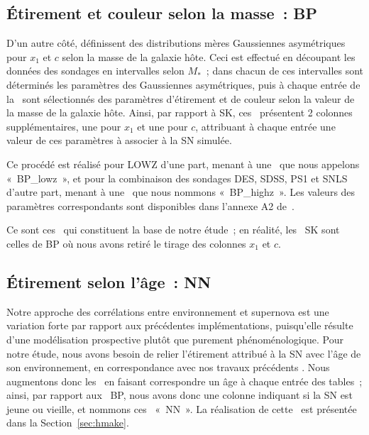 \documentclass[../main/main.tex]{subfiles}
\begin{document}
\subsection{Étirement et couleur selon la masse~: BP}\label{ssec:bp}

D'un autre côté,  définissent des distributions mères
Gaussiennes asymétriques pour $x_1$ et $c$ selon la masse de la galaxie hôte.
Ceci est effectué en découpant les données des sondages en intervalles selon
$M_*$~; dans chacun de ces intervalles sont déterminés les paramètres des
Gaussiennes asymétriques, puis à chaque entrée de la \hostlib\ sont sélectionnés
des paramètres d'étirement et de couleur selon la valeur de la masse de la
galaxie hôte. Ainsi, par rapport à SK, ces \hostlib\ présentent 2 colonnes
supplémentaires, une pour $x_1$ et une pour $c$, attribuant à chaque entrée une
valeur de ces paramètres à associer à la SN simulée. 

Ce procédé est réalisé pour LOWZ d'une part, menant à une \hostlib\ que nous
appelons «~BP\_lowz~», et pour la combinaison des sondages DES, SDSS, PS1 et
SNLS d'autre part, menant à une \hostlib\ que nous nommons «~BP\_highz~». Les
valeurs des paramètres correspondants sont disponibles dans l'annexe A2
de~.

Ce sont ces \hostlib\ qui constituent la base de notre étude~; en réalité, les
\hostlib\ SK sont celles de BP où nous avons retiré le tirage des colonnes $x_1$
et $c$.

\subsection{Étirement selon l'âge~: NN}\label{ssec:nn}

Notre approche des corrélations entre environnement et supernova est une
variation forte par rapport aux précédentes implémentations, puisqu'elle résulte
d'une modélisation prospective plutôt que purement phénoménologique. Pour notre
étude, nous avons besoin de relier l'étirement attribué à la SN avec l'âge de
son environnement, en correspondance avec nos travaux précédents
\citep[][ci-après NN]{nicolas2021}. Nous
augmentons donc les \hostlib\ en faisant correspondre un âge à chaque entrée des
tables~; ainsi, par rapport aux \hostlib\ BP, nous avons donc une colonne
indiquant si la SN est jeune ou vieille, et nommons ces \hostlib\ «~NN~». La
réalisation de cette \hostlib\ est présentée dans la Section~\ref{sec:hmake}.
\end{document}
